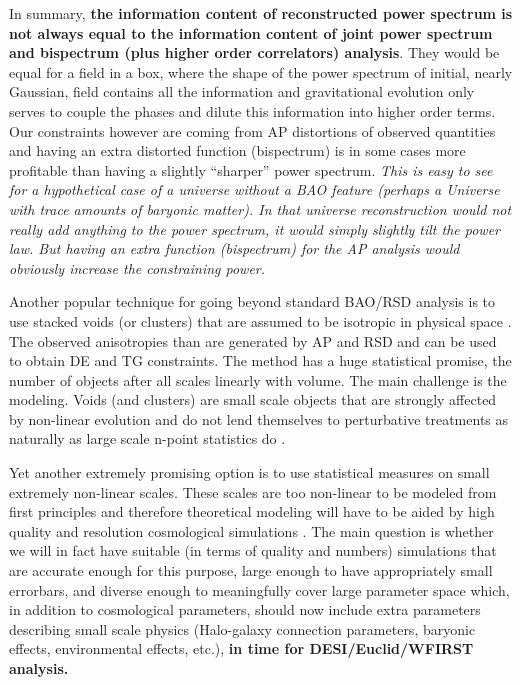 In summary, \textbf{the information content of reconstructed power spectrum is not
always equal to the information content of joint power spectrum and bispectrum
(plus higher order correlators) analysis}. They would be equal for a field in a
box, where the shape of the power spectrum of initial, nearly Gaussian, field
contains all the information and gravitational evolution only serves to couple
the phases and dilute this information into higher order terms. Our constraints
however are coming from AP distortions of observed quantities and having an
extra distorted function (bispectrum) is in some cases more profitable than
having a slightly ``sharper'' power spectrum. \textit{This is easy to see for a
hypothetical case of a universe without a BAO feature (perhaps a Universe with
trace amounts of baryonic matter). In that universe reconstruction would not
really add anything to the power spectrum, it would simply slightly tilt the
power law. But having an extra function (bispectrum) for the AP analysis would
obviously increase the constraining power.}

Another popular technique for going beyond standard BAO/RSD analysis is to use
stacked voids (or clusters) that are assumed to be isotropic in physical space
 \cite{2015MNRAS.451.1036C,2015JCAP...11..036H,2016MNRAS.462.2465C,2017JCAP...07..014H}. The observed anisotropies than are
generated by AP and RSD and can be used to obtain DE and TG constraints. The
method has a huge statistical promise, the number of objects after all scales
linearly with volume. The main challenge is the modeling. Voids (and clusters)
are small scale objects that are strongly affected by non-linear evolution and
do not lend themselves to perturbative treatments as naturally as large scale n-point
statistics do \cite{2017arXiv171207575N}.

Yet another extremely promising option is to use statistical measures on small
extremely non-linear scales. These scales are too non-linear to be modeled from
first principles and therefore theoretical modeling will have to be aided by
high quality and resolution cosmological simulations
\cite{2014MNRAS.444..476R,2015ApJ...810...35K}. The main question is whether we
will in fact have suitable (in terms of quality and numbers) simulations that
are accurate enough for this purpose, large enough to have appropriately small
errorbars, and diverse enough to meaningfully cover large parameter space
which, in addition to cosmological parameters, should now include extra
parameters describing small scale physics (Halo-galaxy connection parameters,
baryonic effects, environmental effects, etc.), \textbf{in time for
DESI/Euclid/WFIRST analysis.}

